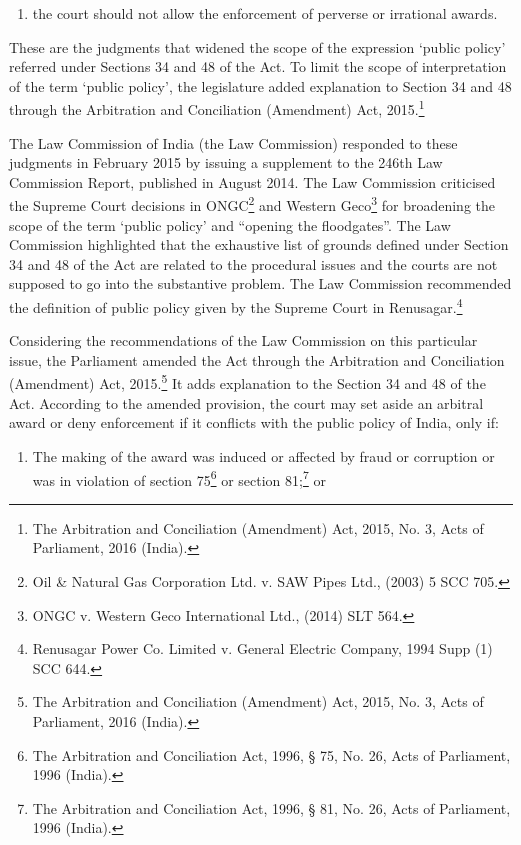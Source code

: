 \begin{multicols}{2}
\begin{enumerate}[label=$\alph*)$]
\item the court should not allow the enforcement of perverse or irrational awards.
\end{enumerate}

\noi
These are the judgments that widened the scope of the expression ‘public policy’ referred
under Sections 34 and 48 of the Act. To limit the scope of interpretation of the term ‘public
policy’, the legislature added explanation to Section 34 and 48 through the Arbitration and
Conciliation (Amendment) Act, 2015.\footnote{The Arbitration and Conciliation (Amendment) Act, 2015, No. 3, Acts of Parliament, 2016 (India).}

\vspace{-.1cm}


\vspace{-.1cm}

\noi
The Law Commission of India (the Law Commission) responded to these judgments in
February 2015 by issuing a supplement to the 246th Law Commission Report, published in
August 2014. The Law Commission criticised the Supreme Court decisions in ONGC\footnote{Oil \& Natural Gas Corporation Ltd. v. SAW Pipes Ltd., (2003) 5 SCC 705.} and
Western Geco\footnote{ONGC v. Western Geco International Ltd., (2014) SLT 564.} for broadening the scope of the term ‘public policy’ and “opening the floodgates”. The Law Commission highlighted that the exhaustive list of grounds defined
under Section 34 and 48 of the Act are related to the procedural issues and the courts are not
supposed to go into the substantive problem. The Law Commission recommended the
definition of public policy given by the Supreme Court in Renusagar.\footnote{Renusagar Power Co. Limited v. General Electric Company, 1994 Supp (1) SCC 644.}

\noi
Considering the recommendations of the Law Commission on this particular issue, the
Parliament amended the Act through the Arbitration and Conciliation (Amendment) Act,
2015.\footnote{The Arbitration and Conciliation (Amendment) Act, 2015, No. 3, Acts of Parliament, 2016 (India).} It adds explanation to the Section 34 and 48 of the Act. According to the amended
provision, the court may set aside an arbitral award or deny enforcement if it conflicts with
the public policy of India, only if:

\vspace{-.5cm}

\begin{enumerate}
\itemsep=0pt
\item The making of the award was induced or affected by fraud or corruption or was in violation of section 75\footnote{The Arbitration and Conciliation Act, 1996, § 75, No. 26, Acts of Parliament, 1996 (India).} or section 81;\footnote{The Arbitration and Conciliation Act, 1996, § 81, No. 26, Acts of Parliament, 1996 (India).} or


\end{enumerate}
\end{multicols}
